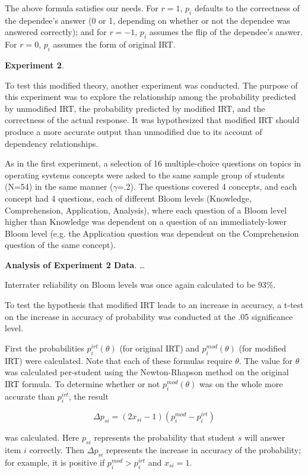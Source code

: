 \documentclass[a4paper,twocolumn]{article}
\begin{document}
The above formula satisfies our needs.  For $r=1$, $p_i$ defaults to the
correctness of the dependee's answer (0 or 1, depending on whether or not the
dependee was answered correctly);  and for $r=-1$, $p_i$ assumes the flip of
the dependee's answer.  For $r=0$, $p_i$ assumes the form of original IRT.  


\textbf{Experiment 2}. 

To test this modified theory, another experiment was conducted.  The purpose of
this experiment was to explore the relationship among the probability predicted
by unmodified IRT, the probability predicted by modified IRT, and the
correctness of the actual response.  It was hypothesized that modified IRT
should produce a more accurate output than unmodified due to its account of
dependency relationships.

As in the first experiment, a selection of 16 multiple-choice questions on
topics in operating systems concepts were asked to the same sample group of
students (N=54) in the same manner ($\gamma$=.2).  The questions covered 4
concepts, and each concept had 4 questions, each of different Bloom levels
(Knowledge, Comprehension, Application, Analysis), where each question of a
Bloom level higher than Knowledge was dependent on a question of an
immediately-lower Bloom level (e.g. the Application question was dependent on
the Comprehension question of the same concept).


\textbf{Analysis of Experiment 2 Data}. \ldots

Interrater reliability on Bloom levels was once again calculated to be 93\%. 

To test the hypothesis that modified IRT leads to an increase in accuracy,
a t-test on the increase in accuracy of probability was conducted at the
.05 significance level.

First the probabilities $p_i^{irt}(\theta)$ (for original IRT) and
$p_i^{mod}(\theta)$ (for modified IRT) were calculated.  Note that each of
these formulas require $\theta$. The value for $\theta$ was calculated
per-student using the Newton-Rhapson method on the original IRT formula.  To
determine whether or not $p_i^{mod}(\theta)$ was on the whole more accurate
than $p_i^{irt}$, the result

\[
  \Delta p_{si} = (2x_{si}-1) (p_i^{mod} - p_i^{irt})
\]

was calculated. Here $p_{si}$ represents the probability that student $s$ will
answer item $i$ correctly.  Then $\Delta p_{si}$ represents the increase in
accuracy of the probability; for example, it is positive if $p_i^{mod} >
p_i^{irt}$ and $x_{si} = 1$.
\end{document}
